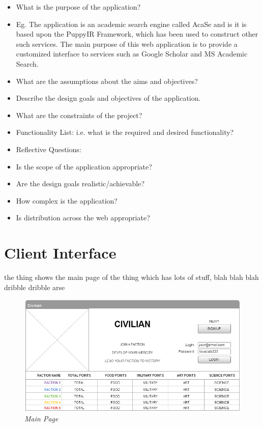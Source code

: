 \documentclass{sig-alt-release2}
\begin{document}
\begin{itemize}

\item	What is the purpose of the application?

\item	Eg. The application is an academic search engine called AcaSe and is it is based upon the PuppyIR Framework\cite{glassey2011framework}, which has been used to construct other such services\cite{glassey2010fifi,elliot2010fifi}. The main purpose of this web application is to provide a customized interface to services such as Google Scholar and MS Academic Search. 

\item	What are the assumptions about the aims and objectives?

\item	Describe the design goals and objectives of the application.

\item	What are the constraints of the project?

\item	Functionality List: i.e. what is the required and desired functionality?

\item	Reflective Questions: 
\item	Is the scope of the application appropriate? 
\item	Are the design goals realistic/achievable? 
\item	How complex is the application? 
\item	Is distribution across the web appropriate? 

\end{itemize}

\section{Client Interface}

the thing shows the main page of the thing which has lots of stuff, blah blah blah dribble dribble arse

\begin{figure}[!htbp]
  \caption{\textit{Main Page}}
  \begin{center}
		\includegraphics[scale=0.25]{img/w3.png}
  \end{center}
\end{figure}
\end{document}
